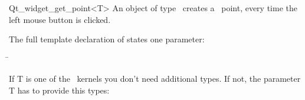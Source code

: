 
\begin{ccRefClass}{Qt_widget_get_point<T>}
\ccDefinition
An object of type \ccRefName\ creates a \cgal\ point, every time 
the left mouse button is clicked.


\ccParameters

The full template declaration of  states one parameter:

\begin{tabbing}
 \=\\
\end{tabbing}

If T is one of the \cgal\ kernels you don't need additional types. If
not, the parameter T has to provide this types:

\ccTypes
{}

\ccInheritsFrom
{}

\ccGlue

\ccCreation
{}


\end{ccRefClass}









